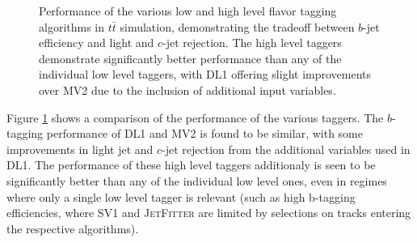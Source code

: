 \begin{figure}[ht]
\centering
{}
\caption{\label{fig:low-vs-high-tag} Performance of the various low and high level flavor tagging algorithms 
in $t\bar{t}$ simulation, demonstrating the tradeoff between $b$-jet efficiency and light and $c$-jet rejection. 
The high level taggers demonstrate significantly better performance than any of the individual low level 
taggers, with DL1 offering slight improvements over MV2 due to the inclusion of additional input variables.}
\end{figure}


Figure \ref{fig:low-vs-high-tag} shows a comparison of the performance of the various taggers. 
The $b$-tagging performance of DL1 and MV2 is found to be similar, with some improvements in 
light jet and $c$-jet rejection from the additional variables used in DL1. 
The performance of these high level taggers additionaly is seen to be significantly better than any of the 
individual low level ones, even in regimes where only a single low level tagger is relevant (such as high 
b-tagging efficiencies, where SV1 and \textsc{JetFitter}\xspace are limited by selections on tracks 
entering the respective algorithms).

